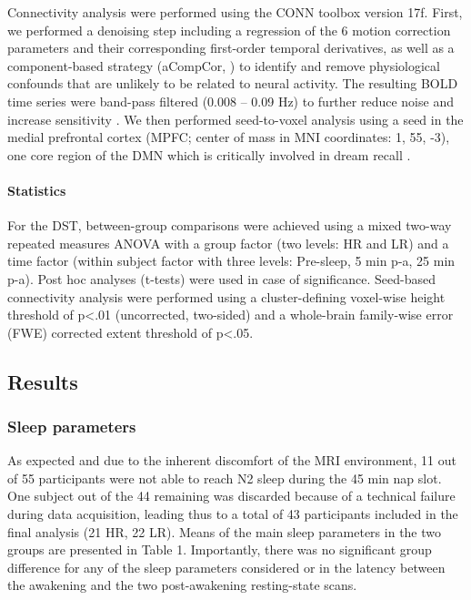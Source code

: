 Connectivity analysis were performed using the CONN toolbox version 17f. First, we performed a denoising step including a regression of the 6 motion correction parameters and their corresponding first-order temporal derivatives, as well as a component-based strategy (aCompCor, \citealp{behzadi_component_2007}) to identify and remove physiological confounds that are unlikely to be related to neural activity. The resulting BOLD time series were band-pass filtered (0.008 – 0.09 Hz) to further reduce noise and increase sensitivity \citep{weissenbacher_correlations_2009}. We then performed seed-to-voxel analysis using a seed in the medial prefrontal cortex (MPFC; center of mass in MNI coordinates: 1, 55, -3), one core region of the DMN which is critically involved in dream recall \citep{solms_neuropsychology_1997, eichenlaub_brain_2014}.

\paragraph{Statistics}
For the DST, between-group comparisons were achieved using a mixed two-way repeated measures ANOVA with a group factor (two levels: HR and LR) and a time factor (within subject factor with three levels: Pre-sleep, 5 min p-a, 25 min p-a). Post hoc analyses (t-tests) were used in case of significance. Seed-based connectivity analysis were performed using a cluster-defining voxel-wise height threshold of p<.01 (uncorrected, two-sided) and a whole-brain family-wise error (FWE) corrected extent threshold of p<.05.

\subsection*{Results}
\label{res:inertia:drf:results}

\subsubsection*{Sleep parameters}
As expected and due to the inherent discomfort of the MRI environment, 11 out of 55 participants were not able to reach N2 sleep during the 45 min nap slot. One subject out of the 44 remaining was discarded because of a technical failure during data acquisition, leading thus to a total of 43 participants included in the final analysis (21 HR, 22 LR). Means of the main sleep parameters in the two groups are presented in Table 1. Importantly, there was no significant group difference for any of the sleep parameters considered or in the latency between the awakening and the two post-awakening resting-state scans.

